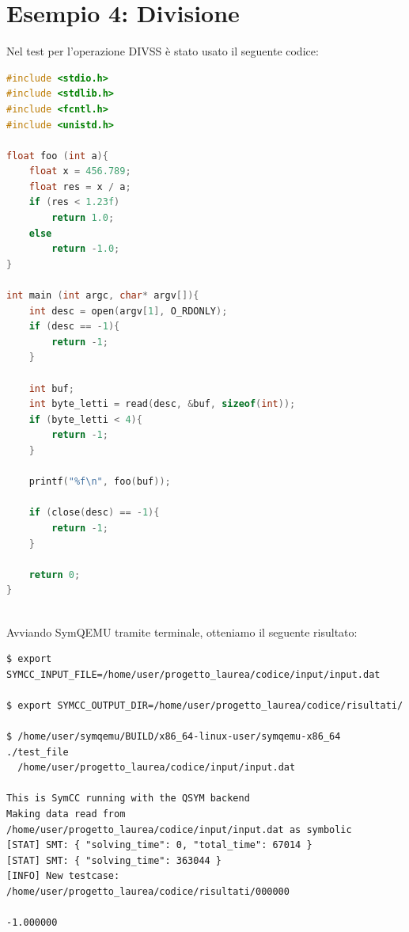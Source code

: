 \documentclass[Lau, oneside]{sapthesis}%
\begin{document}
\newpage
\section{Esempio 4: Divisione}
Nel test per l'operazione DIVSS è stato usato il seguente codice:
\newline
\begin{lstlisting}[xleftmargin=0\textwidth, language=C, basicstyle=\small]
#include <stdio.h>
#include <stdlib.h>
#include <fcntl.h>
#include <unistd.h>

float foo (int a){
    float x = 456.789;
    float res = x / a;
    if (res < 1.23f)
        return 1.0;
    else 
        return -1.0;
}

int main (int argc, char* argv[]){
    int desc = open(argv[1], O_RDONLY);
    if (desc == -1){
        return -1;
    }

    int buf;
    int byte_letti = read(desc, &buf, sizeof(int));
    if (byte_letti < 4){
        return -1;
    }

    printf("%f\n", foo(buf));

    if (close(desc) == -1){
        return -1;
    }

    return 0;
}
\end{lstlisting}
\ \\ \newline
Avviando SymQEMU tramite terminale, otteniamo il seguente risultato:
\begin{lstlisting}[xleftmargin=0\textwidth, basicstyle=\footnotesize]
$ export SYMCC_INPUT_FILE=/home/user/progetto_laurea/codice/input/input.dat

$ export SYMCC_OUTPUT_DIR=/home/user/progetto_laurea/codice/risultati/

$ /home/user/symqemu/BUILD/x86_64-linux-user/symqemu-x86_64  ./test_file 
  /home/user/progetto_laurea/codice/input/input.dat

This is SymCC running with the QSYM backend
Making data read from /home/user/progetto_laurea/codice/input/input.dat as symbolic
[STAT] SMT: { "solving_time": 0, "total_time": 67014 }
[STAT] SMT: { "solving_time": 363044 }
[INFO] New testcase: /home/user/progetto_laurea/codice/risultati/000000

-1.000000
\end{lstlisting}
\end{document}

